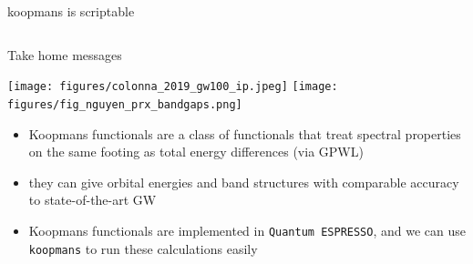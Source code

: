 \documentclass[xcolor=table,aspectratio=169]{beamer}
\numberwithin{equation}{section}
\begin{document}

\begin{frame}{koopmans is scriptable}
   \vspace{-2ex}
   \inputminted[fontsize=\scriptsize,breaklines]{python}{scripts/si.py}
\end{frame}

\begin{frame}{Take home messages}

   \texttt{[image: figures/colonna\_2019\_gw100\_ip.jpeg]}
   \hfill
   \texttt{[image: figures/fig\_nguyen\_prx\_bandgaps.png]}
   \hfill

   \begin{itemize}
      \item Koopmans functionals are a class of functionals that treat spectral properties on the same footing as total energy differences (via GPWL)
      \item they can give orbital energies and band structures with comparable accuracy to state-of-the-art GW
      \item Koopmans functionals are implemented in \texttt{Quantum ESPRESSO}, and we can use \texttt{koopmans} to run these calculations easily
   \end{itemize}

\end{frame}
\end{document}
